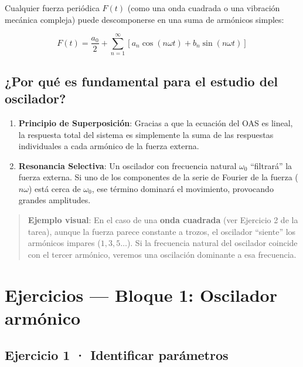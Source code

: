 \documentclass[
  letterpaper,
  DIV=11,
  numbers=noendperiod]{scrreprt}
\providecommand{\tightlist}{%
  \setlength{\itemsep}{0pt}\setlength{\parskip}{0pt}}
\begin{document}
Cualquier fuerza periódica \(F(t)\) (como una onda cuadrada o una
vibración mecánica compleja) puede descomponerse en una suma de
armónicos simples:

\[F(t) = \frac{a_0}{2} + \sum_{n=1}^{\infty} [a_n \cos(n\omega t) + b_n \sin(n\omega t)]\]

\subsection{¿Por qué es fundamental para el estudio del
oscilador?}\label{por-quuxe9-es-fundamental-para-el-estudio-del-oscilador}

\begin{enumerate}
\def\labelenumi{\arabic{enumi}.}
\tightlist
\item
  \textbf{Principio de Superposición}: Gracias a que la ecuación del OAS
  es lineal, la respuesta total del sistema es simplemente la suma de
  las respuestas individuales a cada armónico de la fuerza externa.
\item
  \textbf{Resonancia Selectiva}: Un oscilador con frecuencia natural
  \(\omega_0\) ``filtrará'' la fuerza externa. Si uno de los componentes
  de la serie de Fourier de la fuerza (\(n\omega\)) está cerca de
  \(\omega_0\), ese término dominará el movimiento, provocando grandes
  amplitudes.
\end{enumerate}

\begin{quote}
\textbf{Ejemplo visual}: En el caso de una \textbf{onda cuadrada} (ver
Ejercicio 2 de la tarea), aunque la fuerza parece constante a trozos, el
oscilador ``siente'' los armónicos impares (\(1, 3, 5 \dots\)). Si la
frecuencia natural del oscilador coincide con el tercer armónico,
veremos una oscilación dominante a esa frecuencia.
\end{quote}

\section{Ejercicios --- Bloque 1: Oscilador
armónico}\label{ejercicios-bloque-1-oscilador-armuxf3nico}

\subsection*{Ejercicio 1 · Identificar
parámetros}\label{ejercicio-1-identificar-paruxe1metros}
\end{document}
